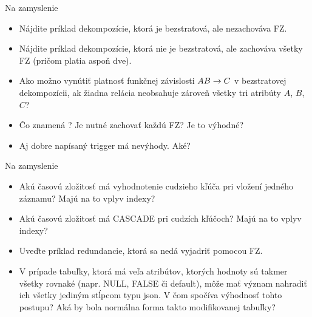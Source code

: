 \documentclass[12pt]{beamer}
\begin{document}
\begin{frame}{Na zamyslenie}
\begin{itemize}
\item Nájdite príklad dekompozície, ktorá je bezstratová, ale nezachováva FZ.
\item Nájdite príklad dekompozície, ktorá nie je bezstratová, ale zachováva všetky FZ (pričom platia aspoň dve).
\item Ako možno vynútiť platnosť funkčnej závislosti $AB\rightarrow C$ v bezstratovej dekompozícii,
    ak žiadna relácia neobsahuje zároveň všetky tri atribúty $A$, $B$, $C$?
\item Čo znamená ? Je nutné zachovať každú FZ? Je to výhodné?
\item Aj dobre napísaný trigger má nevýhody. Aké?
\end{itemize}
\end{frame}

\begin{frame}{Na zamyslenie}
\begin{itemize}
\item Akú časovú zložitosť má vyhodnotenie cudzieho kľúča pri vložení jedného záznamu? Majú na to vplyv indexy?
\item Akú časovú zložitosť má CASCADE pri cudzích kľúčoch? Majú na to vplyv indexy?
\item Uveďte príklad redundancie, ktorá sa nedá vyjadriť pomocou FZ.
\item V prípade tabuľky, ktorá má veľa atribútov, ktorých hodnoty sú takmer všetky rovnaké (napr. NULL, FALSE či default),
    môže mať význam nahradiť ich všetky jediným stĺpcom typu json. V čom spočíva výhodnosť tohto postupu?
    Aká by bola normálna forma takto modifikovanej tabuľky?
\end{itemize}
\end{frame}
\end{document}
